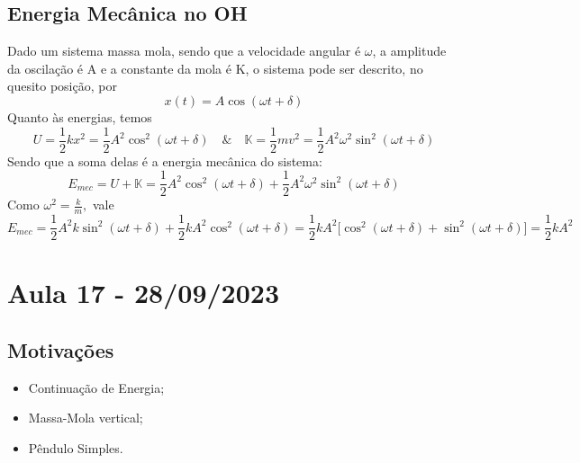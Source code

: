 \documentclass{article}
\begin{document}
\subsection{Energia Mecânica no OH}
  Dado um sistema massa mola, sendo que a velocidade angular é \(\omega \), a amplitude da oscilação é A e a constante da mola é K, o sistema pode ser 
descrito, no quesito posição, por 
  \[
    x(t) = A\cos{(\omega t + \delta )}
  \]
  Quanto às energias, temos 
  \[
    U = \frac{1}{2}kx^{2} = \frac{1}{2}A^{2}\cos^{2}{(\omega t + \delta )}\quad\&\quad \mathbb{K} = \frac{1}{2}mv^{2} = \frac{1}{2}A^{2}\omega ^{2}\sin^{2}{(\omega t+\delta )}
  \]
  Sendo que a soma delas é a energia mecânica do sistema:
    \[
      E_{mec} = U + \mathbb{K} = \frac{1}{2}A^{2}\cos^{2}{(\omega t + \delta )} + \frac{1}{2}A^{2}\omega ^{2}\sin^{2}{(\omega t+\delta )}
    \]
  Como \(\omega^{2} = \frac{k}{m},\) vale 
    \[
      E_{mec} = \frac{1}{2}A^{2}k\sin^{2}{(\omega t + \delta )} + \frac{1}{2}kA^{2}\cos^{2}{(\omega t + \delta )} = \frac{1}{2}kA^{2}\biggl[\cos^{2}{(\omega t+\delta )} + \sin^{2}{(\omega t + \delta )}\biggr] = \frac{1}{2}kA^{2}
    \]
\newpage 

\section{Aula 17 - 28/09/2023}
\subsection{Motivações}
\begin{itemize}
  \item Continuação de Energia;
  \item Massa-Mola vertical;
  \item Pêndulo Simples.
\end{itemize}
\end{document}
